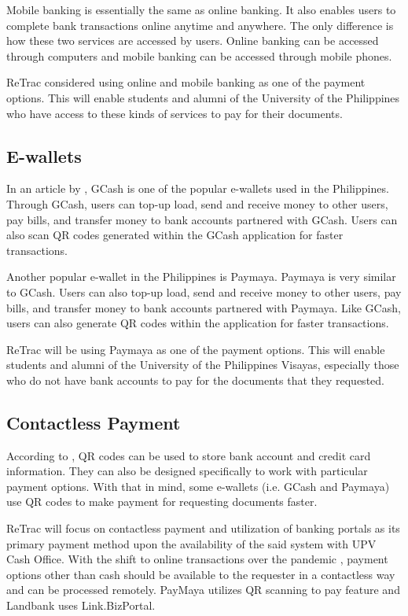 Mobile banking is essentially the same as online banking. It also enables users to complete bank transactions online anytime and anywhere. The only difference is how these two services are accessed by users. Online banking can be accessed through computers and mobile banking can be accessed through mobile phones. 
	
ReTrac considered using online and mobile banking as one of the payment options. This will enable students and alumni of the University of the Philippines who have access to these kinds of services to pay for their documents.

\subsection{E-wallets}
In an article by , GCash is one of the popular e-wallets used in the Philippines. Through GCash, users can top-up load, send and receive money to other users, pay bills, and transfer money to bank accounts partnered with GCash. Users can also scan QR codes generated within the GCash application for faster transactions.

Another popular e-wallet in the Philippines is Paymaya. Paymaya is very similar to GCash. Users can also top-up load, send and receive money to other users, pay bills, and transfer money to bank accounts partnered with Paymaya. Like GCash, users can also generate QR codes within the application for faster transactions. 

ReTrac will be using Paymaya as one of the payment options. This will enable students and alumni of the University of the Philippines Visayas, especially those who do not have bank accounts to pay for the documents that they requested. 

\subsection{Contactless Payment}
According to , QR codes can be used to store bank account and credit card information. They can also be designed specifically to work with particular payment options. With that in mind, some e-wallets (i.e. GCash and Paymaya) use QR codes to make payment for requesting documents faster. 

ReTrac will focus on contactless payment and utilization of banking portals as its primary payment method upon the availability of the said system with UPV Cash Office. With the shift to online transactions over the pandemic \cite{felipe_mendez_2020}, payment options other than cash should be available to the requester in a contactless way and can be processed remotely. PayMaya utilizes QR scanning to pay feature and Landbank uses Link.BizPortal.




